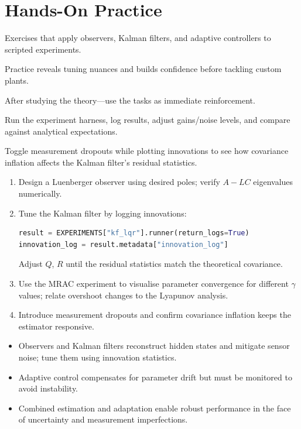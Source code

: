 \section{Hands-On Practice}
\begin{beginnerguide}
    \item[\textbf{What?}] Exercises that apply observers, Kalman filters, and adaptive controllers to scripted experiments.
    \item[\textbf{Why?}] Practice reveals tuning nuances and builds confidence before tackling custom plants.
    \item[\textbf{When?}] After studying the theory—use the tasks as immediate reinforcement.
    \item[\textbf{How?}] Run the experiment harness, log results, adjust gains/noise levels, and compare against analytical expectations.
    \item[\textbf{Example}] Toggle measurement dropouts while plotting innovations to see how covariance inflation affects the Kalman filter’s residual statistics.
\end{beginnerguide}
\begin{enumerate}[leftmargin=*]
    \item Design a Luenberger observer using desired poles; verify $A - L C$ eigenvalues numerically.
    \item Tune the Kalman filter by logging innovations:
\begin{lstlisting}[language=python]
result = EXPERIMENTS["kf_lqr"].runner(return_logs=True)
innovation_log = result.metadata["innovation_log"]
\end{lstlisting}
    Adjust $Q$, $R$ until the residual statistics match the theoretical covariance.
    \item Use the MRAC experiment to visualise parameter convergence for different $\gamma$ values; relate overshoot changes to the Lyapunov analysis.
    \item Introduce measurement dropouts and confirm covariance inflation keeps the estimator responsive.
\end{enumerate}

\begin{takeaway}
\begin{itemize}[leftmargin=*]
    \item Observers and Kalman filters reconstruct hidden states and mitigate sensor noise; tune them using innovation statistics.
    \item Adaptive control compensates for parameter drift but must be monitored to avoid instability.
    \item Combined estimation and adaptation enable robust performance in the face of uncertainty and measurement imperfections.
\end{itemize}
\end{takeaway}

